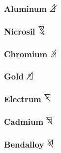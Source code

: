 \documentclass[conference]{IEEEtran}
\begin{document}
	\subsubsection{\textbf{Aluminum}    \includegraphics[height=1em]{images/Aluminum_(Feruchemy).png}}\label{sec:ferrings:aluminum}
	\subsubsection{\textbf{Nicrosil}        \includegraphics[height=1em]{images/Nicrosil_(Feruchemy).png}}\label{sec:ferrings:nicrosil}
	\subsubsection{\textbf{Chromium}        \includegraphics[height=1em]{images/Chromium_(Feruchemy).png}}\label{sec:ferrings:chromium}
	\subsubsection{\textbf{Gold}        \includegraphics[height=1em]{images/Gold_(Feruchemy).png}}\label{sec:ferrings:gold}
	\subsubsection{\textbf{Electrum}        \includegraphics[height=1em]{images/Electrum_(Feruchemy).png}}\label{sec:ferrings:electrum}
	\subsubsection{\textbf{Cadmium}        \includegraphics[height=1em]{images/Cadmium_(Feruchemy).png}}\label{sec:ferrings:cadmium}
	\subsubsection{\textbf{Bendalloy}        \includegraphics[height=1em]{images/Bendalloy_(Feruchemy).png}}\label{sec:ferrings:bendalloy}
\end{document}
